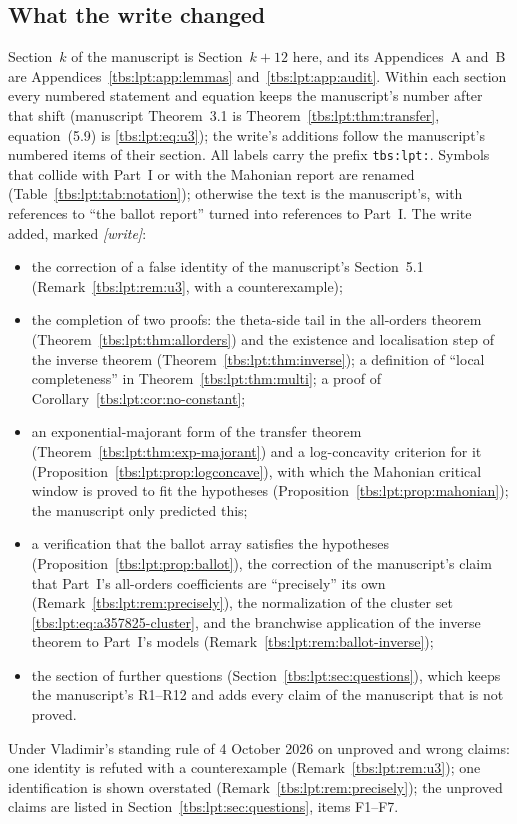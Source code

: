 \documentclass[11pt,a4paper]{article}
\numberwithin{equation}{section}
\theoremstyle{definition}
\newcommand{\code}[1]{\texttt{#1}}
\begin{document}
\subsection{What the write changed}\label{tbs:lpt:sec:changes}
Section~$k$ of the manuscript is Section~$k+12$ here, and its
Appendices~A and~B are Appendices~\ref{tbs:lpt:app:lemmas}
and~\ref{tbs:lpt:app:audit}. Within each section every numbered statement
and equation keeps the manuscript's number after that shift (manuscript
Theorem~3.1 is Theorem~\ref{tbs:lpt:thm:transfer}, equation~(5.9) is
\eqref{tbs:lpt:eq:u3}); the write's additions follow the manuscript's
numbered items of their section. All labels carry the prefix
\code{tbs:lpt:}. Symbols that collide with Part~I or with the Mahonian
report are renamed (Table~\ref{tbs:lpt:tab:notation}); otherwise the
text is the manuscript's, with references to ``the ballot report''
turned into references to Part~I. The write added, marked
\emph{[write]}:
\begin{itemize}
\item the correction of a false identity of the manuscript's Section~5.1
 (Remark~\ref{tbs:lpt:rem:u3}, with a counterexample);
\item the completion of two proofs: the theta-side tail in the all-orders
 theorem (Theorem~\ref{tbs:lpt:thm:allorders}) and the existence and
 localisation step of the inverse theorem
 (Theorem~\ref{tbs:lpt:thm:inverse}); a definition of ``local
 completeness'' in Theorem~\ref{tbs:lpt:thm:multi}; a proof of
 Corollary~\ref{tbs:lpt:cor:no-constant};
\item an exponential-majorant form of the transfer theorem
 (Theorem~\ref{tbs:lpt:thm:exp-majorant}) and a log-concavity criterion
 for it (Proposition~\ref{tbs:lpt:prop:logconcave}), with which the
 Mahonian critical window is proved to fit the hypotheses
 (Proposition~\ref{tbs:lpt:prop:mahonian}); the manuscript only predicted
 this;
\item a verification that the ballot array satisfies the hypotheses
 (Proposition~\ref{tbs:lpt:prop:ballot}), the correction of the
 manuscript's claim that Part~I's all-orders coefficients are
 ``precisely'' its own (Remark~\ref{tbs:lpt:rem:precisely}), the
 normalization of the cluster set \eqref{tbs:lpt:eq:a357825-cluster}, and
 the branchwise application of the inverse theorem to Part~I's models
 (Remark~\ref{tbs:lpt:rem:ballot-inverse});
\item the section of further questions (Section~\ref{tbs:lpt:sec:questions}),
 which keeps the manuscript's R1--R12 and adds every claim of the
 manuscript that is not proved.
\end{itemize}
Under Vladimir's standing rule of 4 October 2026 on unproved and wrong
claims: one identity is refuted with a counterexample
(Remark~\ref{tbs:lpt:rem:u3}); one identification is shown overstated
(Remark~\ref{tbs:lpt:rem:precisely}); the unproved claims are listed in
Section~\ref{tbs:lpt:sec:questions}, items F1--F7.
\end{document}
